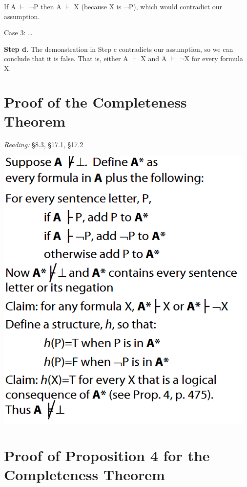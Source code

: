 \documentclass[12pt]{extarticle}
\begin{document}
\begin{multicols*}{3}
\hspace{5mm} If A $\vdash$ ¬P then A $\vdash$ X (because X is ¬P), which would contradict our assumption.
 
Case 3: …
 
\textbf{Step d.} The demonstration in Step c contradicts our assumption, so we can conclude that it is false. That is, either A $\vdash$ X and A $\vdash$ ¬X for every formula X.
 
 
 
\section{Proof of the Completeness Theorem}
 
\emph{Reading:} §8.3, §17.1, §17.2
 
\begin{center}
\includegraphics[scale=0.3]{img/unit_455_completeness.png}
\end{center}
 
 
\section{Proof of Proposition 4 for the Completeness Theorem}
 

\end{multicols*}
\end{document}
